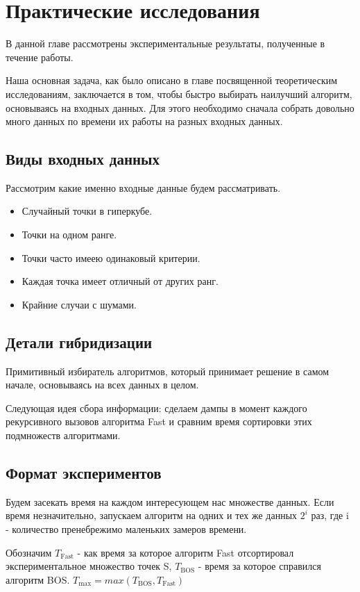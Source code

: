\chapter{Практические исследования} 
\label{chapter3}

В данной главе рассмотрены экспериментальные результаты, полученные в течение работы. 

Наша основная задача, как было описано в главе посвященной теоретическим исследованиям, заключается в том, чтобы быстро выбирать наилучший алгоритм, основываясь на входных данных.   
Для этого необходимо сначала собрать довольно много данных по времени их работы на разных входных данных. 

\section{Виды входных данных}
Рассмотрим какие именно входные данные будем рассматривать. 
\begin{itemize}
	\item Случайный точки в гиперкубе.
	\item Точки на одном ранге.
	\item Точки часто имеею одинаковый критерии. 
	\item Каждая точка имеет отличный от других ранг.
	\item Крайние случаи с шумами.
\end{itemize}

\section{Детали гибридизации}
Примитивный избиратель алгоритмов, который принимает решение в самом начале, основываясь на всех данных в целом.

Следующая идея сбора информации: сделаем дампы в момент каждого рекурсивного вызовов алгоритма Fast и сравним время сортировки этих подмножеств алгоритмами.

\section{Формат экспериментов}
Будем засекать время на каждом интересующем нас множестве данных. Если время незначительно, запускаем алгоритм на одних и тех же данных $2^i$ раз, где i - количество пренебрежимо маленьких замеров времени. 

Обозначим $T_\text{Fast}$ - как время за которое алгоритм Fast отсортировал экспериментальное множество точек S, $T_\text{BOS}$ - время за которое справился алгоритм BOS.  
$T_\text{max} = max (T_\text{BOS}, T_\text{Fast})$


